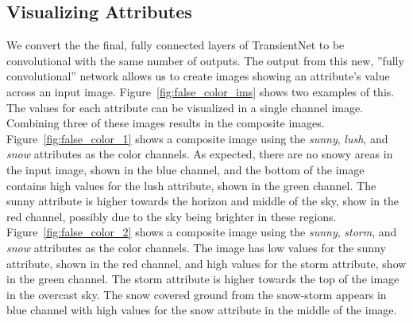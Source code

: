 \documentclass[10pt,twocolumn,letterpaper]{article}
\newcommand{\figref}[1]{Figure~\ref{fig:#1}}
\begin{document}
\subsection{Visualizing Attributes}

We convert the the final, fully connected layers of TransientNet to be
convolutional with the same number of outputs.  The output from this new,
''fully convolutional'' network allows us to create images showing an
attribute's value across an input image.  \figref{false_color_ims} shows two
examples of this.  The values for each attribute can be visualized in a single
channel image.  Combining three of these images results in the composite
images.  \figref{false_color_1} shows a composite image using the
\textit{sunny}, \textit{lush}, and \textit{snow} attributes as the color
channels.  As expected, there are no snowy areas in the input image, shown
in the blue channel, and the bottom of the image contains high values for the
lush attribute, shown in the green channel.  The sunny attribute is higher 
towards the horizon and middle of the sky, show in the red channel, possibly 
due to the sky being brighter in these regions.  \figref{false_color_2} shows
a composite image using the \textit{sunny}, \textit{storm}, and \textit{snow}
attributes as the color channels.  The image has low values for the sunny
attribute, shown in the red channel, and high values for the storm attribute,
show in the green channel.  The storm attribute is higher towards the top
of the image in the overcast sky.  The snow covered ground from the 
snow-storm appears in blue channel with high values for the snow attribute in
the middle of the image.
\end{document}
